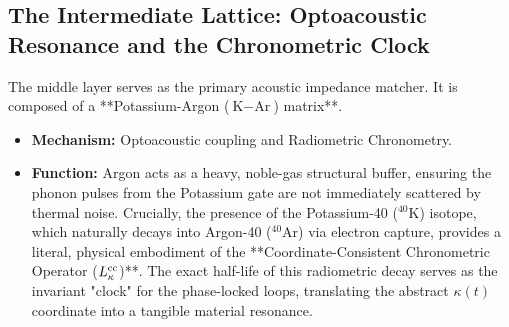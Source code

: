 \subsection[The Intermediate Lattice]{The Intermediate Lattice: Optoacoustic Resonance and the Chronometric Clock}
The middle layer serves as the primary acoustic impedance matcher. It is composed of a **Potassium-Argon ($\text{K}-\text{Ar}$) matrix**.
\begin{itemize}
    \item \textbf{Mechanism:} Optoacoustic coupling and Radiometric Chronometry.
    \item \textbf{Function:} Argon acts as a heavy, noble-gas structural buffer, ensuring the phonon pulses from the Potassium gate are not immediately scattered by thermal noise. Crucially, the presence of the Potassium-40 ($^{40}\text{K}$) isotope, which naturally decays into Argon-40 ($^{40}\text{Ar}$) via electron capture, provides a literal, physical embodiment of the **Coordinate-Consistent Chronometric Operator ($\mathcal{L}_\kappa^{\rm cc}$)**. The exact half-life of this radiometric decay serves as the invariant "clock" for the phase-locked loops, translating the abstract $\kappa(t)$ coordinate into a tangible material resonance.
\end{itemize}

